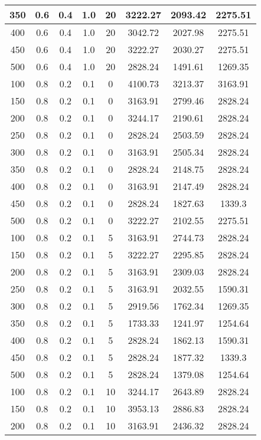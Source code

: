 \documentclass[a4paper, 12pt]{extreport}
\begin{document}
\begin{itemize}
\begin{longtable}{|c|c|c|c|c|c|c|c|}
			350 & 0.6 & 0.4 & 1.0 & 20 & 3222.27 & 2093.42 & 2275.51 \\\hline
			400 & 0.6 & 0.4 & 1.0 & 20 & 3042.72 & 2027.98 & 2275.51 \\\hline
			450 & 0.6 & 0.4 & 1.0 & 20 & 3222.27 & 2030.27 & 2275.51 \\\hline
			500 & 0.6 & 0.4 & 1.0 & 20 & 2828.24 & 1491.61 & 1269.35 \\\hline
			100 & 0.8 & 0.2 & 0.1 & 0 & 4100.73 & 3213.37 & 3163.91 \\\hline
			150 & 0.8 & 0.2 & 0.1 & 0 & 3163.91 & 2799.46 & 2828.24 \\\hline
			200 & 0.8 & 0.2 & 0.1 & 0 & 3244.17 & 2190.61 & 2828.24 \\\hline
			250 & 0.8 & 0.2 & 0.1 & 0 & 2828.24 & 2503.59 & 2828.24 \\\hline
			300 & 0.8 & 0.2 & 0.1 & 0 & 3163.91 & 2505.34 & 2828.24 \\\hline
			350 & 0.8 & 0.2 & 0.1 & 0 & 2828.24 & 2148.75 & 2828.24 \\\hline
			400 & 0.8 & 0.2 & 0.1 & 0 & 3163.91 & 2147.49 & 2828.24 \\\hline
			450 & 0.8 & 0.2 & 0.1 & 0 & 2828.24 & 1827.63 & 1339.3 \\\hline
			500 & 0.8 & 0.2 & 0.1 & 0 & 3222.27 & 2102.55 & 2275.51 \\\hline
			100 & 0.8 & 0.2 & 0.1 & 5 & 3163.91 & 2744.73 & 2828.24 \\\hline
			150 & 0.8 & 0.2 & 0.1 & 5 & 3222.27 & 2295.85 & 2828.24 \\\hline
			200 & 0.8 & 0.2 & 0.1 & 5 & 3163.91 & 2309.03 & 2828.24 \\\hline
			250 & 0.8 & 0.2 & 0.1 & 5 & 3163.91 & 2032.55 & 1590.31 \\\hline
			300 & 0.8 & 0.2 & 0.1 & 5 & 2919.56 & 1762.34 & 1269.35 \\\hline
			350 & 0.8 & 0.2 & 0.1 & 5 & 1733.33 & 1241.97 & 1254.64 \\\hline
			400 & 0.8 & 0.2 & 0.1 & 5 & 2828.24 & 1862.13 & 1590.31 \\\hline
			450 & 0.8 & 0.2 & 0.1 & 5 & 2828.24 & 1877.32 & 1339.3 \\\hline
			500 & 0.8 & 0.2 & 0.1 & 5 & 2828.24 & 1379.08 & 1254.64 \\\hline
			100 & 0.8 & 0.2 & 0.1 & 10 & 3244.17 & 2643.89 & 2828.24 \\\hline
			150 & 0.8 & 0.2 & 0.1 & 10 & 3953.13 & 2886.83 & 2828.24 \\\hline
			200 & 0.8 & 0.2 & 0.1 & 10 & 3163.91 & 2436.32 & 2828.24 \\\hline

\end{longtable}
\end{itemize}
\end{document}
